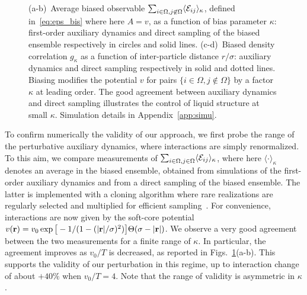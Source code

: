 \documentclass[pre, superscriptaddress, twocolumn,pre]{revtex4-1}
\begin{document}
\begin{figure}
	\caption{\label{fig:energybias}
		(a-b)~Average biased observable $\sum_{i\in\Omega,j\not\in\Omega}\langle{\cal E}_{ij}\rangle_\kappa$, defined in~\eqref{eq:eps_bis} where here $A=v$, as a function of bias parameter $\kappa$: first-order auxiliary dynamics and direct sampling of the biased ensemble respectively in circles and solid lines.
		(c-d)~Biased density correlation $g_\kappa$ as a function of inter-particle distance $r/\sigma$: auxiliary dynamics and direct sampling respectively in solid and dotted lines.
		Biasing modifies the potential $v$ for pairs $\{i\in\Omega,j\not\in\Omega\}$ by a factor $\kappa$ at leading order. The good agreement between auxiliary dynamics and direct sampling illustrates the control of liquid structure at small $\kappa$.
		Simulation details in Appendix~\ref{app:simu}.
}
\end{figure}


To confirm numerically the validity of our approach, we first probe the range of the perturbative auxiliary dynamics, where interactions are simply renormalized. To this aim, we compare measurements of $\sum_{i\in\Omega, j\in\Omega}\langle{\cal E}_{ij}\rangle_\kappa$, where here $\langle\cdot\rangle_\kappa$ denotes an average in the biased ensemble, obtained from simulations of the first-order auxiliary dynamics and from a direct sampling of the biased ensemble. The latter is implemented with a cloning algorithm where rare realizations are regularly selected and multiplied for efficient sampling~\cite{Giadina2006, tailleur2007probing, Hurtado2009, Nemoto2016, Ray2018, Klymko2018, Brewer2018}. For convenience, interactions are now given by the soft-core potential $v({\bf r}) = v_0\exp\big[-1 / (1 - (|{\bf r}|/\sigma)^2)\big]\Theta(\sigma-|{\bf r}|)$. We observe a very good agreement between the two measurements for a finite range of $\kappa$. In particular, the agreement improves as $v_0/T$ is decreased, as reported in Figs.~\ref{fig:energybias}(a-b). This supports the validity of our perturbation in this regime, up to interaction change of about $+40\%$ when $v_0/T=4$. Note that the range of validity is asymmetric in $\kappa$. 
\end{document}
